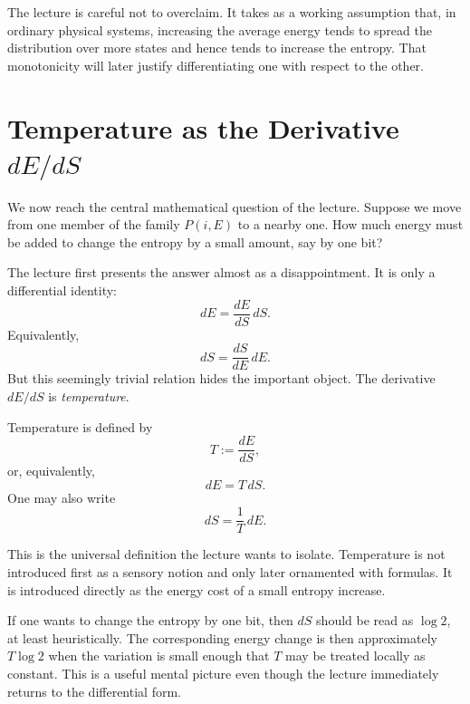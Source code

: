 The lecture is careful not to overclaim. It takes as a working assumption that, in ordinary physical systems, increasing the average energy tends to spread the distribution over more states and hence tends to increase the entropy. That monotonicity will later justify differentiating one with respect to the other.

\section{Temperature as the Derivative \texorpdfstring{$dE/dS$}{dE/dS}}

We now reach the central mathematical question of the lecture. Suppose we move from one member of the family \(P(i,E)\) to a nearby one. How much energy must be added to change the entropy by a small amount, say by one bit?

The lecture first presents the answer almost as a disappointment. It is only a differential identity:
\begin{equation}
dE = \frac{dE}{dS}\,dS.
\end{equation}
Equivalently,
\begin{equation}
dS = \frac{dS}{dE}\,dE.
\end{equation}
But this seemingly trivial relation hides the important object. The derivative \(dE/dS\) is \emph{temperature}.

\begin{definition}
Temperature is defined by
\begin{equation}
T := \frac{dE}{dS},
\end{equation}
or, equivalently,
\begin{equation}
dE = T\,dS.
\end{equation}
One may also write
\begin{equation}
dS = \frac{1}{T}\,dE.
\end{equation}
\end{definition}

This is the universal definition the lecture wants to isolate. Temperature is not introduced first as a sensory notion and only later ornamented with formulas. It is introduced directly as the energy cost of a small entropy increase.

If one wants to change the entropy by one bit, then \(dS\) should be read as \(\log 2\), at least heuristically. The corresponding energy change is then approximately \(T\log 2\) when the variation is small enough that \(T\) may be treated locally as constant. This is a useful mental picture even though the lecture immediately returns to the differential form.


